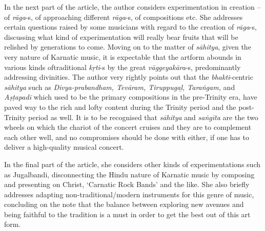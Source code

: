 In the next part of the article, the author considers experimentation in creation – of \textit{rāga}-s, of approaching different \textit{rāga}-s, of compositions etc. She addresses certain questions raised by some musicians with regard to the creation of \textit{rāga}-s, discussing what kind of experimentation will really bear fruits that will be relished by generations to come. Moving on to the matter of \textit{sāhitya}, given the very nature of Karnatic music, it is expectable that the artform abounds in various kinds of\break traditional \textit{kṛti}-s by the great \textit{vāggeyakāra}-s, predominantly addressing divinities. The author very rightly points out that the \textit{bhakti}-centric \textit{sāhitya} such as \textit{Divya-prabandham, Tevāram, Tiruppugaḻ, Taraṅgam, }and\textit{ Aṣṭapadī} which used to be the primary compositions in the pre-Trinity era, have paved way to the rich and lofty content during the Trinity period and the post-Trinity period as well. It is to be recognised that \textit{sāhitya} and \textit{saṅgīta} are the two wheels on which the chariot of the concert cruises and they are to complement each other well, and no compromises should be done with either, if one has to deliver a high-quality musical concert.

In the final part of the article, she considers other kinds of experimentations such as Jugalbandi, disconnecting the Hindu nature of Karnatic music by composing and presenting on Christ, ‘Carnatic Rock Bands’ and the like. She also briefly addresses adapting non-traditional/modern instruments for this genre of music, concluding on the note that the balance between exploring new avenues and being faithful to the tradition is a must in order to get the best out of this art form.


